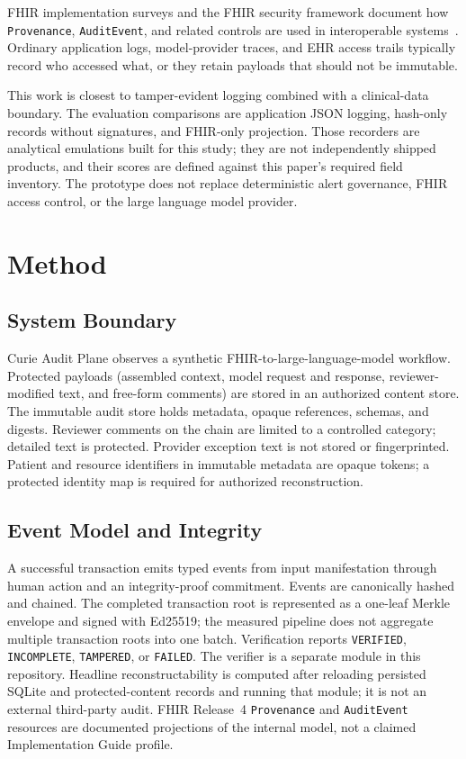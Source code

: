 \documentclass[journal]{IEEEtran}
\begin{document}
FHIR implementation surveys and the FHIR security framework document how
\texttt{Provenance}, \texttt{AuditEvent}, and related controls are used in
interoperable systems~\cite{ayaz2021fhir,hl7security,ihe-atna}. Ordinary
application logs, model-provider traces, and EHR access trails typically record
who accessed what, or they retain payloads that should not be immutable.

This work is closest to tamper-evident logging combined with a clinical-data
boundary. The evaluation comparisons are application JSON logging, hash-only
records without signatures, and FHIR-only projection. Those recorders are
analytical emulations built for this study; they are not independently
shipped products, and their scores are defined against this paper's required
field inventory. The prototype does not replace deterministic alert
governance, FHIR access control, or the large language model provider.

\section{Method}
\label{sec:method}

\subsection{System Boundary}
\label{sec:boundary}

Curie Audit Plane observes a synthetic FHIR-to-large-language-model workflow.
Protected payloads (assembled context, model request and response,
reviewer-modified text, and free-form comments) are stored in an authorized
content store. The immutable audit store holds metadata, opaque references,
schemas, and digests. Reviewer comments on the chain are limited to a
controlled category; detailed text is protected. Provider exception text is
not stored or fingerprinted. Patient and resource identifiers in immutable
metadata are opaque tokens; a protected identity map is required for
authorized reconstruction.

\subsection{Event Model and Integrity}
\label{sec:events}

A successful transaction emits typed events from input manifestation through
human action and an integrity-proof commitment. Events are canonically hashed
and chained. The completed transaction root is represented as a one-leaf
Merkle envelope and signed with Ed25519; the measured pipeline does not
aggregate multiple transaction roots into one batch. Verification reports
\texttt{VERIFIED}, \texttt{INCOMPLETE}, \texttt{TAMPERED}, or \texttt{FAILED}.
The verifier is a separate module in this repository. Headline reconstructability
is computed after reloading persisted SQLite and protected-content records and
running that module; it is not an external third-party audit. FHIR Release~4
\texttt{Provenance} and \texttt{AuditEvent} resources are documented
projections of the internal model, not a claimed Implementation Guide
profile.
\end{document}
